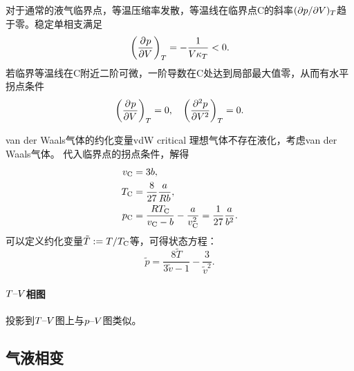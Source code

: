\begin{notecaptionblock}
	\label{fig:H2O phase P-V}
\end{notecaptionblock}

对于通常的液气临界点，等温压缩率发散，等温线在临界点C的斜率$(\p p/\p V)_T$趋于零。稳定单相支满足
\[
	\pvat{p}{V}{T} = -\frac{1}{V\kappa_T} < 0 .
\]
若临界等温线在C附近二阶可微，一阶导数在C处达到局部最大值零，从而有水平拐点条件
\begin{equation}
	\label{eqn:critical point}
	\pvat{p}{V}{T} = 0,\quad\biggp{\pv[2]pV}_T = 0.
\end{equation}

\begin{example}
	{van der Waals气体的约化变量}{vdW critical}
	理想气体不存在液化，考虑van der Waals气体。
	代入临界点的拐点条件，解得
	\begin{subequations}
		\label{eqn:vdW critical}
		\begin{align}
			v_\criticalpoint &= 3b,\\
			T_\criticalpoint &= \frac{8}{27}\frac{a}{Rb},\\
			p_\criticalpoint &= \frac{RT_\criticalpoint}{v_\criticalpoint - b} - \frac a{v_\criticalpoint^2} = \frac1{27}\frac a{b^2}.
		\end{align}
	\end{subequations}
	可以定义约化变量$\tilde T := T/T_\criticalpoint$等，可得状态方程：
	\begin{equation}
		\tilde p = \frac{8\tilde T}{3\tilde v - 1} - \frac3{\tilde v^2}.
	\end{equation}
\end{example}

\paragraph{$T\vs V$相图}

投影到$T\vs V$图上与$p\vs V$图类似。

\subsection{气液相变}
\label{ssec:liquid-gas phase transition}

